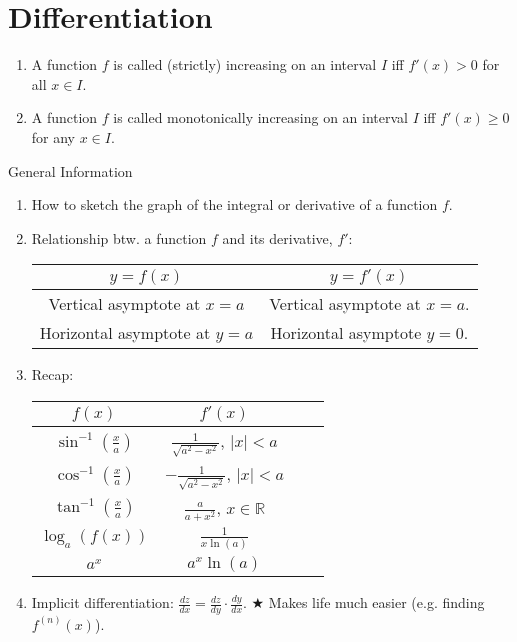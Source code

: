 \documentclass[oneside]{book}
\begin{document}
\chapter{Differentiation}
\begin{definition*}{}{}
  \begin{enumerate}
    \item A function \(f\) is called (strictly) increasing on an interval \(I\) iff \(f'(x)>0\) for all \(x \in I\).
    \item A function \(f\) is called monotonically increasing on an interval \(I\) iff \(f'(x) \geq 0\) for any \(x \in I\).
  \end{enumerate}
\end{definition*}
\begin{stbox}{General Information}
  \begin{enumerate}
    \item How to sketch the graph of the integral or derivative of a function \(f\).
    \item Relationship btw. a function \(f\) and its derivative, \(f'\):\\
    \begin{tabular}{|c|c|}
      \hline
      \(y=f(x)\) & \(y=f'(x)\)\\
      \hline
      Vertical asymptote at \(x=a\) & Vertical asymptote at \(x=a\).\\
      \hline
      Horizontal asymptote at \(y=a\) & Horizontal asymptote \(y=0\).\\
      \hline
    \end{tabular}
    \item Recap:\\
    \begin{tabular}{|Sc|Sc|}
      \hline
      \(f(x)\) & \(f'(x)\)\\
      \hline
      \(\sin^{-1}\left(\frac{x}{a}\right)\) & \(\frac{1}{\sqrt{a^2-x^2}}\), \(\lvert x \rvert<a\)\\
      \hline
      \(\cos^{-1}\left(\frac{x}{a}\right)\) & \(-\frac{1}{\sqrt{a^2-x^2}}\), \(\lvert x \rvert<a\)\\
      \hline
      \(\tan^{-1}\left(\frac{x}{a}\right)\) & \(\frac{a}{a+x^2}\), \(x \in \mathbb{R}\)\\
      \hline
      \(\log_a(f(x))\) &  \(\frac{1}{x \ln(a)}\)\\
      \hline
      \(a^x\) & \(a^x \ln(a)\)\\
      \hline
    \end{tabular}
    \item Implicit differentiation: \(\frac{dz}{dx}=\frac{dz}{dy}\cdot \frac{dy}{dx}\). \(\bigstar\) Makes life much easier (e.g. finding \(f^{(n)}(x)\)). 

\end{enumerate}
\end{stbox}
\end{document}
